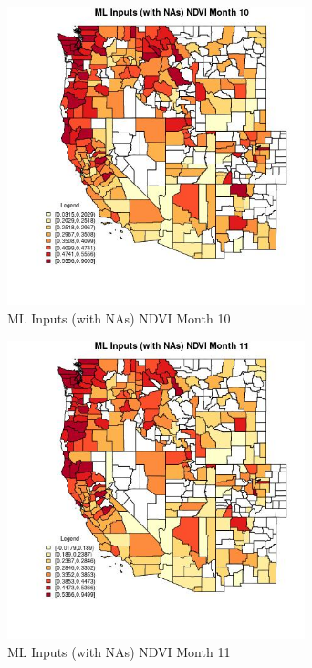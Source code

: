 \begin{figure} 
\centering  
\includegraphics[width=0.77\textwidth]{Code_Outputs/Report_ML_input_PM25_Step4_part_f_de_duplicated_aveswNAs_CountyNDVImedianMonth10.jpg} 
\caption{\label{fig:Report_ML_input_PM25_Step4_part_f_de_duplicated_aveswNAsCountyNDVImedianMonth10}ML Inputs (with NAs) NDVI Month 10} 
\end{figure} 
 

\begin{figure} 
\centering  
\includegraphics[width=0.77\textwidth]{Code_Outputs/Report_ML_input_PM25_Step4_part_f_de_duplicated_aveswNAs_CountyNDVImedianMonth11.jpg} 
\caption{\label{fig:Report_ML_input_PM25_Step4_part_f_de_duplicated_aveswNAsCountyNDVImedianMonth11}ML Inputs (with NAs) NDVI Month 11} 
\end{figure} 
 

